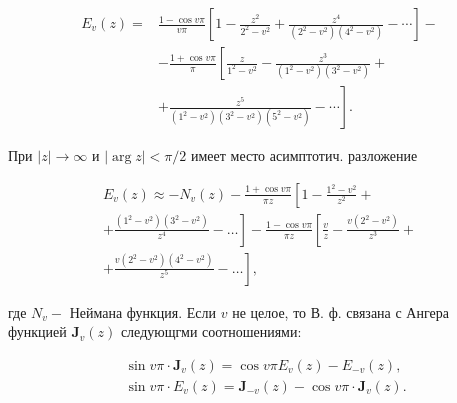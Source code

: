 \documentclass[10pt]{article}
\begin{document}
\[

\begin{aligned}

E_{v}(z)= & \frac{1-\cos v \pi}{v \pi}\left[1-\frac{z^{2}}{2^{2}-v^{2}}+\frac{z^{4}}{\left(2^{2}-v^{2}\right)\left(4^{2}-v^{2}\right)}-\cdots\right]- \\

& -\frac{1+\cos v \pi}{\pi}\left[\frac{z}{1^{2}-v^{2}}-\frac{z^{3}}{\left(1^{2}-v^{2}\right)\left(3^{2}-v^{2}\right)}+\right. \\

& \left.+\frac{z^{5}}{\left(1^{2}-v^{2}\right)\left(3^{2}-v^{2}\right)\left(5^{2}-v^{2}\right)}-\cdots\right] .

\end{aligned}

\]



При $|z| \rightarrow \infty$ и $|\arg z|<\pi / 2$ имеет место асимптотич. разложение



\[

\begin{gathered}

E_{v}(z) \approx-N_{v}(z)-\frac{1+\cos v \pi}{\pi z}\left[1-\frac{1^{2}-v^{2}}{z^{2}}+\right. \\

\left.+\frac{\left(1^{2}-v^{2}\right)\left(3^{2}-v^{2}\right)}{z^{4}}-\ldots\right]-\frac{1-\cos v \pi}{\pi z}\left[\frac{v}{z}-\frac{v\left(2^{2}-v^{2}\right)}{z^{3}}+\right. \\

\left.+\frac{v\left(2^{2}-v^{2}\right)\left(4^{2}-v^{2}\right)}{z^{5}}-\ldots\right],

\end{gathered}

\]



где $N_{v}-$ Неймана функция. Если $v$ не целое, то В. ф. связана с Ангера функцией $\mathbf{J}_{v}(z)$ следующгми соотношениями:



\[

\begin{aligned}

& \sin v \pi \cdot \mathbf{J}_{v}(z)=\cos v \pi E_{v}(z)-E_{-v}(z), \\

& \sin v \pi \cdot E_{v}(z)=\mathbf{J}_{-v}(z)-\cos v \pi \cdot \mathbf{J}_{v}(z) .

\end{aligned}

\]
\end{document}
